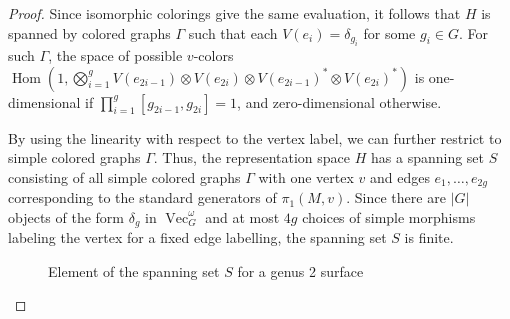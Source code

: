 \documentclass{amsart}
\DeclareMathOperator{\Vect}{Vec}
\DeclareMathOperator{\Hom}{Hom}
\newcommand{\one}{1}
\begin{document}
\begin{proof}
Since isomorphic colorings give the same evaluation, it follows that $H$ is spanned by colored graphs $\Gamma$ such that
each $V(e_i) = \delta_{g_i}$ for some $g_i \in G$.  For such $\Gamma$,  the space of possible $v$-colors $\Hom (\one, \bigotimes_{i=1}^g V(e_{2i-1}) \otimes V(e_{2i})  \otimes V(e_{2i-1})^* \otimes V(e_{2i})^*)$ is one-dimensional if $\prod_{i=1}^g [g_{2i-1}, g_{2i}] = 1$, and zero-dimensional otherwise.

By using the linearity with respect to the vertex label, we can further restrict to simple colored graphs $\Gamma$.  Thus, the representation space $H$ has a spanning set $S$ consisting of all simple colored graphs $\Gamma$ with one vertex $v$ and edges $e_1, \ldots, e_{2g}$ corresponding to the standard generators of $\pi_1(M,v)$.  Since there are $|G|$ objects of the form $\delta_g$ in $\Vect_G^\omega$ and at most $4g$ choices of simple morphisms labeling the vertex for a fixed edge labelling, the spanning set $S$ is finite.

\newdimen\R
\R=0.8cm

\begin{figure}
   \centering
\caption{Element of the spanning set $S$ for a genus 2 surface}
\label{fig:span}
\end{figure}


\end{proof}
\end{document}
